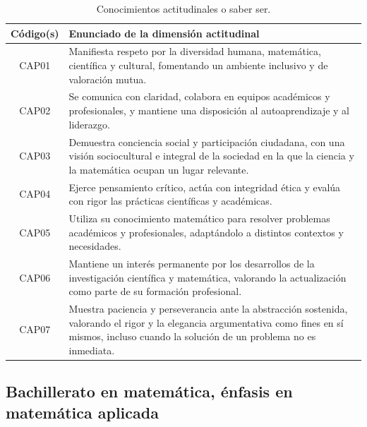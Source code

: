 \documentclass[11pt,a4paper]{article}
\begin{document}
\begin{table}[H]
\centering
\renewcommand{\arraystretch}{1.3}
\begin{tabular}{|c|p{9cm}|}
\hline
\cellcolor[HTML]{00C0F3}\textbf{Código(s)} & \cellcolor[HTML]{00C0F3}\textbf{Enunciado de la dimensión actitudinal} \\
\hline
CAP01 & Manifiesta respeto por la diversidad humana, matemática, científica y cultural, fomentando un ambiente inclusivo y de valoración mutua. \\
\hline
CAP02 & Se comunica con claridad, colabora en equipos académicos y profesionales, y mantiene una disposición al autoaprendizaje y al liderazgo.\\
\hline
CAP03 & Demuestra conciencia social y participación ciudadana, con una visión sociocultural e integral de la sociedad en la que la ciencia y la matemática ocupan un lugar relevante.\\
\hline
CAP04 & Ejerce pensamiento crítico, actúa con integridad ética y evalúa con rigor las prácticas científicas y académicas.\\
\hline
CAP05 & Utiliza su conocimiento matemático para resolver problemas académicos y profesionales, adaptándolo a distintos contextos y necesidades.\\
\hline
CAP06 & Mantiene un interés permanente por los desarrollos de la investigación científica y matemática, valorando la actualización como parte de su formación profesional.\\
\hline
CAP07 & Muestra paciencia y perseverancia ante la abstracción sostenida, valorando el rigor y la elegancia argumentativa como fines en sí mismos, incluso cuando la solución de un problema no es inmediata.\\
\hline
\end{tabular}
\caption{Conocimientos actitudinales o saber ser.}
\end{table}


\subsection*{Bachillerato en matemática, énfasis en matemática aplicada}
\end{document}
